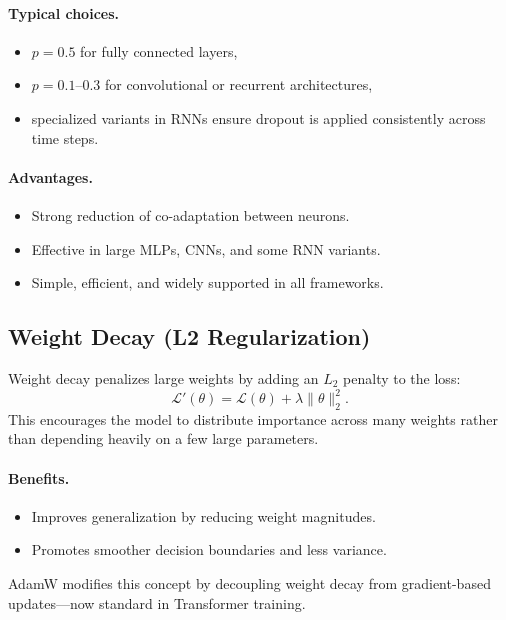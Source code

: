 \documentclass[12pt,a4paper]{report}
\begin{document}
\paragraph{Typical choices.}
\begin{itemize}
    \item $p = 0.5$ for fully connected layers,
    \item $p = 0.1$–$0.3$ for convolutional or recurrent architectures,
    \item specialized variants in RNNs ensure dropout is applied consistently across time steps.
\end{itemize}

\paragraph{Advantages.}
\begin{itemize}
    \item Strong reduction of co-adaptation between neurons.
    \item Effective in large MLPs, CNNs, and some RNN variants.
    \item Simple, efficient, and widely supported in all frameworks.
\end{itemize}

\vspace{1em}
\subsection{Weight Decay (L2 Regularization)}

Weight decay penalizes large weights by adding an $L_2$ penalty to the loss:
\[
\mathcal{L}'(\theta) = \mathcal{L}(\theta) + \lambda \|\theta\|_2^2.
\]
This encourages the model to distribute importance across many weights rather than depending heavily on a few large parameters.

\paragraph{Benefits.}
\begin{itemize}
    \item Improves generalization by reducing weight magnitudes.
    \item Promotes smoother decision boundaries and less variance.
\end{itemize}

AdamW modifies this concept by decoupling weight decay from gradient-based updates—now standard in Transformer training.
\end{document}

